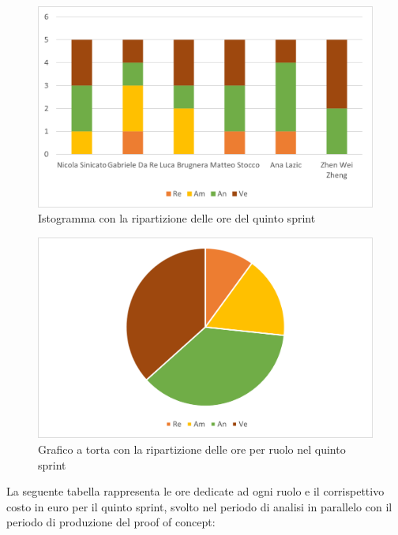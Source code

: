\begin{figure}[H]
	\centering
	\includegraphics[scale=0.6]{img/grafi preventivo/istogrammi/analisi/periodo3.png}
	\caption{Istogramma con la ripartizione delle ore del quinto sprint}
\end{figure}
\begin{figure}[H]
	\centering
	\includegraphics[scale=0.6]{img/grafi preventivo/torta/analisi/periodo3.png}
	\caption{Grafico a torta con la ripartizione delle ore per ruolo nel quinto sprint}
\end{figure}
La seguente tabella rappresenta le ore dedicate ad ogni ruolo e il corrispettivo costo in euro per il quinto sprint, svolto nel periodo di analisi in parallelo con il periodo di produzione del proof of concept:

